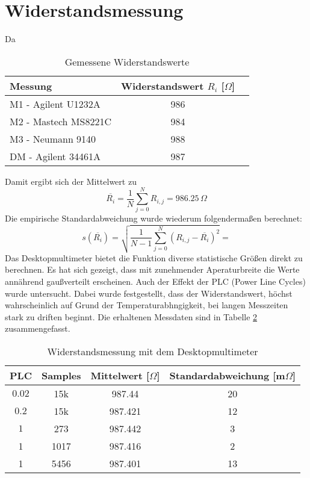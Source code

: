 \section{Widerstandsmessung}
Da 
\begin{table}[h]
	\centering
	\begin{tabular}{|l|c|c|}
	\hline 
	Messung & Widerstandswert $R_i$ [$\Omega$]\\ 
	\hline 
	M1 - Agilent U1232A & 986		\\ 
	\hline 
	M2 - Mastech MS8221C & 984		\\ 
	\hline 
	M3 - Neumann 9140 & 988		\\ 
	\hline 
	DM - Agilent 34461A & 987		\\ 
	\hline 
	\end{tabular}
	\caption{Gemessene Widerstandswerte}
	\label{tb:widerstandswerte}
\end{table} \noindent
Damit ergibt sich der Mittelwert zu
\begin{equation}
	\overline{R_i} = \frac{1}{N} \sum\limits_{j=0}^N R_{i,j} = 986.25\, \Omega
	\label{eq:mittelw}
\end{equation}
Die empirische Standardabweichung wurde wiederum folgendermaßen berechnet:
\begin{equation}
	s(\overline{R_i}) = \sqrt{\frac{1}{N-1} \sum\limits_{j=0}^N (R_{i,j} - \overline{R_i})^2}= 
	\label{eq:stdabw}
\end{equation}
Das Desktopmultimeter bietet die Funktion diverse statistische Größen direkt zu berechnen. Es hat sich gezeigt, dass mit zunehmender Aperaturbreite die Werte annährend gaußverteilt erscheinen. Auch der Effekt der PLC (Power Line Cycles) wurde untersucht. Dabei wurde festgestellt, dass der Widerstandswert, höchst wahrscheinlich auf Grund der Temperaturabhngigkeit, bei langen Messzeiten stark zu driften beginnt. Die erhaltenen Messdaten sind in Tabelle \ref{tb:widerstand_dm} zusammengefasst.
\begin{table}[h]
	\centering
	\begin{tabular}{|c|c|c|c|}
	\hline 
	PLC & Samples & Mittelwert [$\Omega$] & Standardabweichung [m$\Omega$] \\ 
	\hline 
	$0.02$ & 15k & 987.44 & 20 \\ 
	\hline 
	$0.2$ & 15k & 987.421 & 12 \\ 
	\hline 
	$1$ & 273 & 987.442 & 3 \\ 
	\hline 
	1 & 1017 & 987.416 & 2 \\ 
	\hline 
	1 & 5456 & 987.401 & 13 \\ 
	\hline 
	\end{tabular}
	\caption{Widerstandsmessung mit dem Desktopmultimeter}
	\label{tb:widerstand_dm}
\end{table}


